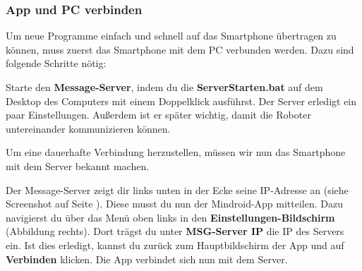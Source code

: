 \documentclass[
	12pt,
	article,
	type=bsc, %
	colorbacktitle,
	instlogo,
	accentcolor=tud1c,
	draft,
	german,
	twoside
]{tudexercise}
\begin{document}
	\subsubsection{App und PC verbinden}
	Um neue Programme einfach und schnell auf das Smartphone übertragen zu können, muss zuerst das Smartphone mit dem PC verbunden werden. Dazu sind folgende Schritte nötig:
	\begin{enumerate}
	\begin{minipage}{.5\textwidth}
	
	\item Starte den \textbf{Message-Server}, indem du die \textbf{ServerStarten.bat} auf dem Desktop des Computers mit einem Doppelklick ausführst. Der Server erledigt ein paar Einstellungen. Außerdem ist er später wichtig, damit die Roboter untereinander kommunizieren können.
	 
	\item Um eine dauerhafte Verbindung herzustellen, müssen wir nun das Smartphone mit dem Server bekannt machen.	
	\item Der Message-Server zeigt dir links unten in der Ecke seine IP-Adresse an (siehe Screenshot auf Seite \pageref{fig:server}). Diese musst du nun der Mindroid-App mitteilen. Dazu navigierst du über das Menü oben links in den \textbf{Einstellungen-Bildschirm} (Abbildung rechts). Dort trägst du unter \textbf{MSG-Server IP} die IP des Servers ein. Ist dies erledigt, kannst du zurück zum Hauptbildschirm der App und auf \textbf{Verbinden} klicken. Die App verbindet sich nun mit dem Server.
	
	\end{minipage}	
	\begin{minipage}{.5\textwidth}
	

\end{minipage}
\end{enumerate}
\end{document}
